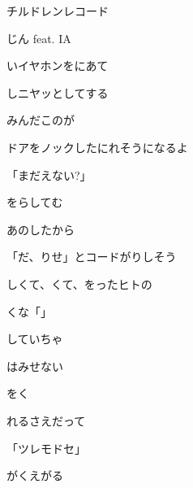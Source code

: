\documentclass[a4paper,tate,twocolumn,12pt]{ltjtarticle}
\begin{document}
\thispagestyle{empty}

\begin{center}
{\LARGE チルドレンレコード}

{\large じん feat. IA}
\end{center}

\vspace{1em}

\begin{flushleft}

\noindent\begin{minipage}{\linewidth}
いイヤホンをにあて

しニヤッとしてする

みんだこのが

ドアをノックしたにれそうになるよ

「まだえない?」

をらしてむ

あのしたから

「だ、りせ」とコードがりしそう
\end{minipage}

\vspace{2em}

\noindent\begin{minipage}{\linewidth}
しくて、くて、をったヒトの

くな「」

していちゃ

はみせない
\end{minipage}

\vspace{2em}

\noindent\begin{minipage}{\linewidth}
をく

れるさえだって

「ツレモドセ」

がくえがる
\end{minipage}


\end{flushleft}
\end{document}
